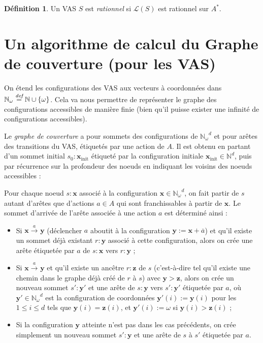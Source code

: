 \documentclass[a4paper,final]{article}
\theoremstyle{definition}
\newtheorem{Definition}[Theorem]{Définition}
\let\leq\leqslant
\newcommand{\os}[1]{\left\{\mathinner{#1}\right\}}
\newcommand{\defeq}{\ensuremath{\stackrel{\textit{def}}{=}}}
\let\union\cup
\newcommand{\N}{\ensuremath{\mathbb{N}}}
\newcommand{\Nomega}{\ensuremath{\mathbb{N}_\omega}}
\newcommand{\lang}{\ensuremath{\mathcal{L}}}
\newcommand{\trans}[2]{\ensuremath{\stackrel{#1}{\longrightarrow}_{#2}}}
\newcommand{\vect}[1]{\ensuremath{\mathbf{#1}}}
\newcommand{\xinit}{\ensuremath{\vect{x}_\text{init}}}
\newcommand{\valeur}[1]{\ensuremath{\overline{#1}}}
\begin{document}
\begin{Definition}
Un VAS $S$ est \emph{rationnel} si $\lang(S)$ est rationnel sur $A^\ast$.
\end{Definition}

\section{Un algorithme de calcul du Graphe de couverture (pour les VAS)}

On étend les configurations des VAS aux vecteurs à coordonnées dans $\Nomega\defeq \N\union\os{\omega}$.
Cela va nous permettre de représenter le graphe des configurations accessibles de manière finie (bien qu'il puisse exister une infinité de configurations accessibles).

Le \emph{graphe de couverture} a pour sommets des configurations de $\Nomega^d$ et pour arêtes des transitions du VAS, étiquetés par une action de $A$.
Il est obtenu en partant d'un sommet initial $s_0:\xinit$ étiqueté par la configuration initiale $\xinit\in \N^d$, puis par récurrence sur la profondeur des noeuds en indiquant les voisins des noeuds accessibles :

Pour chaque noeud $s:\vect{x}$ associé à la configuration $\vect{x}\in \Nomega^d$, on fait partir de $s$ autant d'arêtes que d'actions $a\in A$ qui sont franchissables à partir de $\vect{x}$.
Le sommet d'arrivée de l'arête associée à une action $a$ est déterminé ainsi :
\begin{itemize}
    \item Si $\vect{x}\trans{a}{} \vect{y}$ (déclencher $a$ aboutit à la configuration $\vect{y} := \vect{x} + \valeur{a}$) 
    et qu'il existe un sommet déjà existant $r:\vect{y}$ associé à cette configuration, alors on crée une arête étiquetée par $a$ de $s:\vect{x}$ vers $r:\vect{y}$ ;
    \item Si $\vect{x}\trans{a}{} \vect{y}$ et qu'il existe un ancêtre $r:\vect{z}$ de $s$ (c'est-à-dire tel qu'il existe une chemin dans le graphe déjà créé de $r$ à $s$) avec $\vect{y}>\vect{z}$, 
    alors on crée un nouveau sommet $s':\vect{y'}$ et une arête de $s:\vect{y}$ vers $s':\vect{y'}$ étiquetée par $a$, 
    où $\vect{y'}\in \Nomega^d$ est la configuration de coordonnées $\vect{y'}(i):=\vect{y}(i)$ pour les $1\leq i\leq d$ tels que $\vect{y}(i)=\vect{z}(i)$, et $\vect{y'}(i):=\omega$ si $\vect{y}(i)>\vect{z}(i)$ ;
    \item Si la configuration $\vect{y}$ atteinte n'est pas dans les cas précédents, on crée simplement un nouveau sommet $s':\vect{y}$ et une arête de $s$ à $s'$ étiquetée par $a$.
\end{itemize}
\end{document}
